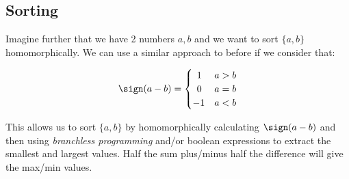 


\subsection{Sorting}
Imagine further that we have 2 numbers $a, b$ and we want to sort $\{a, b\}$ homomorphically. We can use a similar approach to before if we consider that:

\begin{equation}
    \sign(a - b) = \begin{cases} 
      \;\,1 & a > b \\
      \;\,0 & a = b \\
      -1 & a < b
   \end{cases}
\end{equation}

This allows us to sort $\{a, b\}$ by homomorphically calculating $\sign(a - b)$ and then using \emph{branchless programming} and/or boolean expressions to extract the smallest and largest values. Half the sum plus/minus half the difference will give the max/min values.

